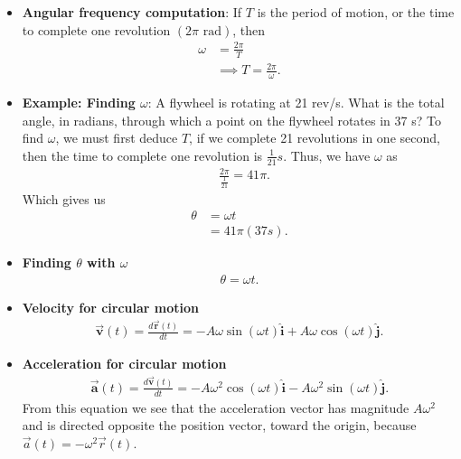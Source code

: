 \documentclass{report}
\begin{document}
\begin{itemize}
            \item \textbf{Angular frequency computation}:
                If $T$ is the period of motion, or the time to complete one revolution $(2\pi \text{ rad})$, then 
                \begin{align*}
                    \omega &= \frac{2\pi}{T} \\
                    &\implies T = \frac{2\pi}{\omega}
                .\end{align*}
            \item \textbf{Example: Finding $\omega$}: A flywheel is rotating at 21 rev/s. What is the total angle, in radians, through which a point on the flywheel rotates in 37 s?
                \bigbreak \noindent 
                To find $\omega$, we must first deduce $T$, if we complete 21 revolutions in one second, then the time to complete one revolution is $\frac{1}{21}s$. Thus, we have $\omega$ as 
                \begin{align*}
                    &\frac{2\pi}{\frac{1}{21}} = 41\pi
                .\end{align*}
                Which gives us 
                \begin{align*}
                    \theta  &= \omega t \\
                    &=41\pi(37s)
                .\end{align*}
            \item \textbf{Finding $\theta$ with $\omega$}
                \begin{align*}
                    \theta  = \omega t
                .\end{align*}
            \item \textbf{Velocity for circular motion}
                \begin{align*}
                    \vec{\mathbf{v}}(t) = \frac{d\vec{\mathbf{r}}(t)}{dt} = -A\omega\sin{(\omega t)}\hat{\mathbf{i}} + A\omega\cos{(\omega t)}\hat{\mathbf{j}}
                .\end{align*}
            \item \textbf{Acceleration for circular motion}
                \begin{align*}
                    \vec{\mathbf{a}}(t) = \frac{d\vec{\mathbf{v}}(t)}{dt} = -A\omega^{2}\cos{(\omega t)}\hat{\mathbf{i}} - A\omega^{2}\sin{(\omega t)}\hat{\mathbf{j}}
                .\end{align*}
                From this equation we see that the acceleration vector has magnitude $A\omega^2$ and is directed opposite the position vector, toward the origin, because $\vec{a}(t) = -\omega^2 \vec{r}(t)$.

\end{itemize}
\end{document}
